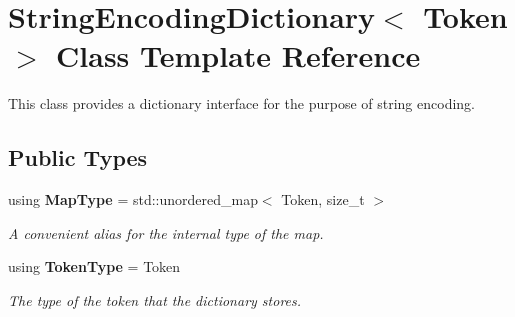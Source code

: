 \section{String\+Encoding\+Dictionary$<$ Token $>$ Class Template Reference}
\label{classmlpack_1_1data_1_1StringEncodingDictionary}


This class provides a dictionary interface for the purpose of string encoding.  


\subsection*{Public Types}
\begin{DoxyCompactItemize}
\item 
using \textbf{ Map\+Type} = std\+::unordered\+\_\+map$<$ Token, size\+\_\+t $>$
\begin{DoxyCompactList}\small\item\em A convenient alias for the internal type of the map. \end{DoxyCompactList}\item 
using \textbf{ Token\+Type} = Token
\begin{DoxyCompactList}\small\item\em The type of the token that the dictionary stores. \end{DoxyCompactList}\end{DoxyCompactItemize}
